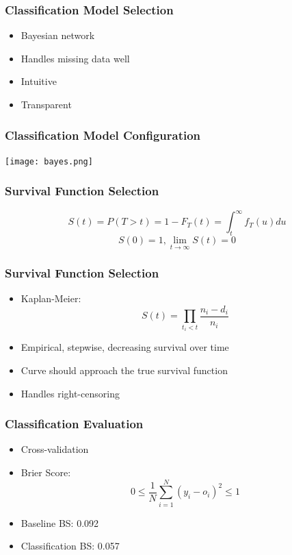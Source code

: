 \documentclass[serif,final,bigger]{beamer}
\begin{document}
  \begin{frame}
    \frametitle{Classification Model Selection}
    \begin{itemize}
      \item Bayesian network
      \item Handles missing data well
      \item Intuitive
      \item Transparent
    \end{itemize}
  \end{frame}

  \begin{frame}
    \frametitle{Classification Model Configuration}
    \begin{center}
      \texttt{[image: bayes.png]}
    \end{center}
  \end{frame}

  \begin{frame}
    \frametitle{Survival Function Selection}
    $$S(t) = P(T > t) = 1 - F_T(t) = \int_t^\infty f_T(u) du$$
    $$S(0) = 1, \lim_{t \to \infty} S(t) = 0$$
  \end{frame}

  \begin{frame}
    \frametitle{Survival Function Selection}
    \begin{itemize}
      \item Kaplan-Meier:
      $$S(t) = \prod_{t_i < t} \frac{n_i - d_i}{n_i}$$
      \item Empirical, stepwise, decreasing survival over time
      \item Curve should approach the true survival function
      \item Handles right-censoring
    \end{itemize}
  \end{frame}

  \begin{frame}
    \frametitle{Classification Evaluation}
    \begin{itemize}
      \item Cross-validation
      \item Brier Score:
      $$0 \leq \frac{1}{N} \sum_{i=1}^N (y_i - o_i)^2 \leq 1$$
      \item Baseline BS: 0.092
      \item Classification BS: 0.057
    \end{itemize}
  \end{frame}
\end{document}
